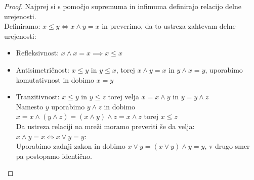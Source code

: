 \documentclass[a4paper]{article}
\begin{document}
\begin{proof}
Najprej si s pomočjo supremuma in infimuma definirajo relacijo delne urejenosti.\\
Definiramo: $x \leq y \iff x \land y = x$ in preverimo, da to ustreza zahtevam delne urejenosti:
\begin{itemize}
\item Refleksivnost: $x \land x = x \implies x \leq x$
\item Antisimetričnost: $x \leq y$ in $y \leq x$, torej $x \land y = x$ in $y \land x = y$, uporabimo komutativnost in dobimo $x = y$
\item Tranzitivnost: $x \leq y$ in $y \leq z$ torej velja $x = x \land y$ in $y = y \land z$ \\ Namesto $y$ uporabimo $y \land z$ in dobimo $x = x \land (y \land z) = (x \land y) \land z = x \land z$ torej  $x \leq z$\\
Da ustreza relaciji na mreži moramo preveriti še da velja: $x \land y = x \iff x \lor y = y$:\\ 
Uporabimo zadnji zakon in dobimo $x \lor y = (x \lor y) \land y = y$, v drugo smer pa postopamo identično.
\end{itemize}
\end{proof}
\end{document}
